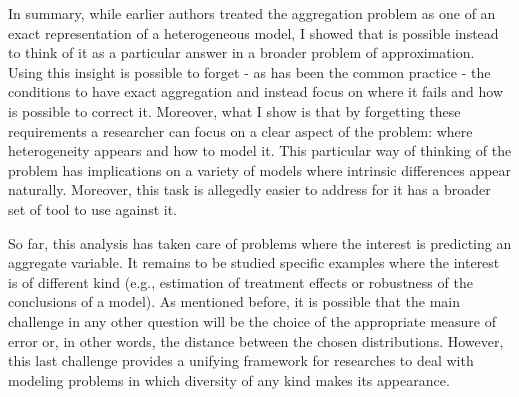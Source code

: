 \documentclass[english, a4paper,12pt]{article}
\begin{document}
In summary, while earlier authors treated the aggregation problem as one of an exact representation of a heterogeneous model, I showed that is possible instead to think of it as a particular answer in a broader problem of approximation. Using this insight is possible to forget - as has been the common practice - the conditions to have exact aggregation and instead focus on where it fails and how is possible to correct it. Moreover, what I show is that by forgetting these requirements a researcher can focus on a clear aspect of the problem: where heterogeneity appears and how to model it. This particular way of thinking of the problem has implications on a variety of models where intrinsic differences appear naturally. Moreover, this task is allegedly easier to address for it has a broader set of tool to use against it. 

So far, this analysis has taken care of problems where the interest is predicting an aggregate variable. It remains to be studied specific examples where the interest is of different kind (e.g., estimation of treatment effects or robustness of the conclusions of a model). As mentioned before, it is possible that the main challenge in any other question will be the choice of the appropriate measure of error or, in other words, the distance between the chosen distributions. However, this last challenge provides a unifying framework for researches to deal with modeling problems in which diversity of any kind makes its appearance.



\end{document}
